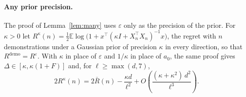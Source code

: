 \documentclass{article}
\newcommand{\E}{\mathbb{E}}
\begin{document}
\paragraph{Any prior precision.}
The proof of Lemma~\ref{lem:many} uses $\varepsilon$ only as the precision of the prior. For $\kappa > 0$ let $R^{\kappa}(n) = \tfrac12 \E \log\big(1 + x^\top (\kappa I + X_n^\top X_n)^{-1} x\big)$, the regret with $n$ demonstrations under a Gaussian prior of precision $\kappa$ in every direction, so that $R^{\mathrm{demo}} = R^{\varepsilon}$. With $\kappa$ in place of $\varepsilon$ and $1/\kappa$ in place of $a_0$, the same proof gives $\Delta \in [\kappa, \kappa(1+F)]$ and, for $\ell \ge \max(d, 7)$,
\begin{equation}\label{eq:any-kappa}
2R^{\kappa}(n) = 2\bar R(n) - \frac{\kappa d}{\ell^2} + O\!\left(\frac{(\kappa + \kappa^2)\, d^2}{\ell^3}\right).
\end{equation}
\end{document}
